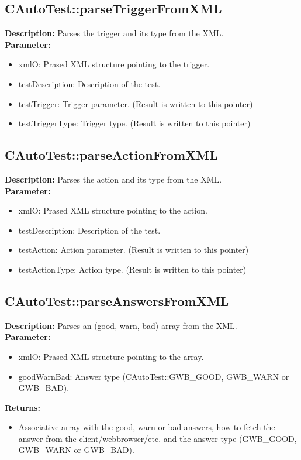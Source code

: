 \subsection{CAutoTest::parseTriggerFromXML}
\textbf{Description:} Parses the trigger and its type from the XML.\\
\textbf{Parameter:}
\begin{itemize}
\item xmlO: Prased XML structure pointing to the trigger.
\item testDescription: Description of the test.
\item testTrigger: Trigger parameter. (Result is written to this pointer)
\item testTriggerType: Trigger type. (Result is written to this pointer)
\end{itemize}

\subsection{CAutoTest::parseActionFromXML}
\textbf{Description:} Parses the action and its type from the XML.\\
\textbf{Parameter:}
\begin{itemize}
\item xmlO: Prased XML structure pointing to the action.
\item testDescription: Description of the test.
\item testAction: Action parameter. (Result is written to this pointer)
\item testActionType: Action type. (Result is written to this pointer)
\end{itemize}

\subsection{CAutoTest::parseAnswersFromXML}
\textbf{Description:} Parses an (good, warn, bad) array from the XML.\\
\textbf{Parameter:}
\begin{itemize}
\item xmlO: Prased XML structure pointing to the array.
\item goodWarnBad: Answer type (CAutoTest::GWB\_GOOD, GWB\_WARN or GWB\_BAD).
\end{itemize}
\textbf{Returns:}
\begin{itemize}
\item Associative array with the good, warn or bad answers, how to fetch the answer from the client/webbrowser/etc. and the answer type (GWB\_GOOD, GWB\_WARN or GWB\_BAD).
\end{itemize}

